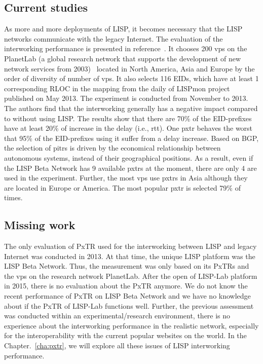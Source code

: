 \subsection{Current studies}
\label{subsec:interworking_studies}
As more and more deployments of LISP, it becomes necessary that the LISP networks communicate with the legacy Internet. The evaluation of the interworking performance is presented in reference~\cite{coras2014performance}. It chooses 200 \acrshort{vp}s on the PlanetLab (a global research network that supports the development of new network services from 2003)~\cite{PlanetLab} located in North America, Asia and Europe by the order of diversity of number of \acrshort{vp}s. It also selects 116 EIDs, which have at least 1 corresponding RLOC in the mapping from the daily of LISPmon project~\cite{lispmon} published on May  2013. The experiment is conducted from November  to  2013. The authors find that the interworking generally has a negative impact compared to without using LISP. The results show that there are 70\% of the EID-prefixes have at least 20\% of increase in the delay (i.e., \acrfull{rtt}). One \acrshort{pxtr} behaves the worst that 95\% of the EID-prefixes using it suffer from a delay increase. Based on BGP, the selection of \acrshort{pitr}s is driven by the economical relationship between autonomous systems, instead of their geographical positions. As a result, even if the LISP Beta Network has 9 available \acrshort{pxtr}s at the moment, there are only 4 are used in the experiment. Further, the most \acrshort{vp}s use \acrshort{pxtr}s in Asia although they are located in Europe or America. The most popular \acrshort{pxtr} is selected 79\% of times.

\subsection{Missing work}
\label{subsec:interworking_missing}
The only evaluation of PxTR used for the interworking between LISP and legacy Internet was conducted in 2013. At that time, the unique LISP platform was the LISP Beta Network. Thus, the measurement was only based on its PxTRs and the \acrshort{vp}s on the research network PlanetLab. After the open of LISP-Lab platform in 2015, there is no evaluation about the PxTR anymore. We do not know the recent performance of PxTR on LISP Beta Network and we have no knowledge about if the PxTR of LISP-Lab functions well. Further, the previous assessment was conducted within an experimental/research environment, there is no experience about the interworking performance in the realistic network, especially for the interoperability with the current popular websites on the world. In the Chapter.~\ref{cha:pxtr}, we will explore all these issues of LISP interworking performance.

